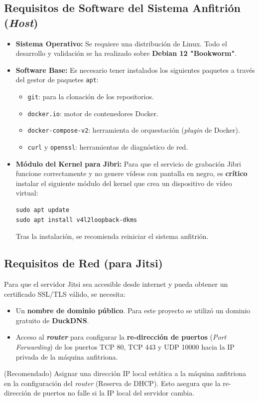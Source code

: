 \subsection{Requisitos de Software del Sistema Anfitrión (\textit{Host})}
\begin{itemize}
    \item \textbf{Sistema Operativo:} Se requiere una distribución de Linux. Todo el desarrollo y validación se ha realizado sobre \textbf{Debian 12 "Bookworm"}.
    \item \textbf{Software Base:} Es necesario tener instalados los siguientes paquetes a través del gestor de paquetes \texttt{apt}:
        \begin{itemize}
            \item \texttt{git}: para la clonación de los repositorios.
            \item \texttt{docker.io}: motor de contenedores Docker.
            \item \texttt{docker-compose-v2}: herramienta de orquestación (\textit{plugin} de Docker).
            \item \texttt{curl} y \texttt{openssl}: herramientas de diagnóstico de red.
        \end{itemize}
    \item \textbf{Módulo del Kernel para Jibri:} Para que el servicio de grabación Jibri funcione correctamente y no genere vídeos con pantalla en negro, es \textbf{crítico} instalar el siguiente módulo del kernel que crea un dispositivo de vídeo virtual:
    \begin{verbatim}
sudo apt update
sudo apt install v4l2loopback-dkms
    \end{verbatim}
    Tras la instalación, se recomienda reiniciar el sistema anfitrión.
\end{itemize}

\subsection{Requisitos de Red (para Jitsi)}
Para que el servidor Jitsi sea accesible desde internet y pueda obtener un certificado SSL/TLS válido, se necesita:
\begin{itemize}
    \item Un \textbf{nombre de dominio público}. Para este proyecto se utilizó un dominio gratuito de \textbf{DuckDNS}.
    \item Acceso al \textbf{\textit{router}} para configurar la \textbf{re-dirección de puertos} (\textit{Port Forwarding}) de los puertos TCP 80, TCP 443 y UDP 10000 hacia la IP privada de la máquina anfitriona.
\end{itemize}
(Recomendado) Asignar una dirección IP local estática a la máquina anfitriona en la configuración del \textit{router} (Reserva de DHCP). Esto asegura que la re-dirección de puertos no falle si la IP local del servidor cambia.

